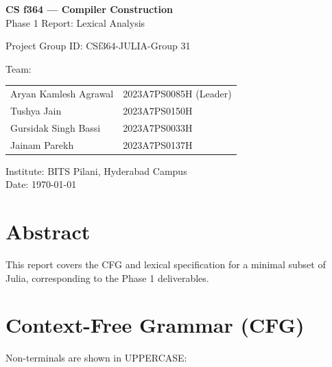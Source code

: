 \documentclass[11pt]{article}
\begin{document}
\begin{titlepage}
  \centering
  {\Huge \textbf{ CS f364 — Compiler Construction\\[1ex]}}
  {\LARGE Phase 1 Report: Lexical Analysis\\[4ex]}

  {\LARGE Project Group ID: CSf364-JULIA-Group 31\\[2ex]}

  {\LARGE Team:}\\[3ex]
  {\Large
\begin{tabular}{@{}ll@{}}
  Aryan Kamlesh Agrawal & 2023A7PS0085H (Leader) \\
  Tushya Jain & 2023A7PS0150H \\
  Gursidak Singh Bassi & 2023A7PS0033H \\
  Jainam Parekh & 2023A7PS0137H \\
\end{tabular}
}

  \vfill
  {\large Institute: BITS Pilani, Hyderabad Campus}\\
  {\large Date: \today}
\end{titlepage}

\section*{Abstract}
This report covers the CFG and lexical specification for a minimal subset of Julia,
corresponding to the Phase 1 deliverables.

\section{Context-Free Grammar (CFG)}
Non-terminals are shown in UPPERCASE:
\end{document}
